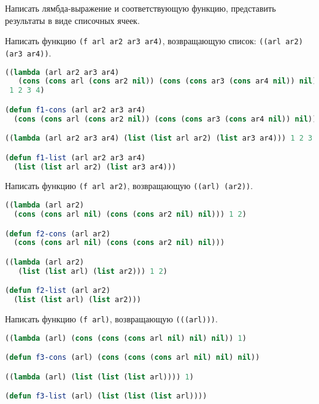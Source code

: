 Написать лямбда-выражение и соответствующую функцию, представить результаты в
виде списочных ячеек.

Написать функцию \verb|(f arl ar2 ar3 ar4)|, возвращающую \newline список:
\verb|((arl ar2) (ar3 ar4))|.

\begin{lstlisting}[language=Lisp]
((lambda (arl ar2 ar3 ar4)
   (cons (cons arl (cons ar2 nil)) (cons (cons ar3 (cons ar4 nil)) nil)))
 1 2 3 4)

(defun f1-cons (arl ar2 ar3 ar4)
  (cons (cons arl (cons ar2 nil)) (cons (cons ar3 (cons ar4 nil)) nil)))

((lambda (arl ar2 ar3 ar4) (list (list arl ar2) (list ar3 ar4))) 1 2 3 4)

(defun f1-list (arl ar2 ar3 ar4)
  (list (list arl ar2) (list ar3 ar4)))
\end{lstlisting}

\begin{figure}[h]
    \centering
    \def\svgwidth{\textwidth}
    
\end{figure}

\pagebreak

Написать функцию \verb|(f arl ar2)|, возвращающую \verb|((arl) (ar2))|.

\begin{lstlisting}[language=Lisp]
((lambda (arl ar2)
  (cons (cons arl nil) (cons (cons ar2 nil) nil))) 1 2)

(defun f2-cons (arl ar2)
  (cons (cons arl nil) (cons (cons ar2 nil) nil)))

((lambda (arl ar2)
   (list (list arl) (list ar2))) 1 2)

(defun f2-list (arl ar2)
  (list (list arl) (list ar2)))
\end{lstlisting}

\begin{figure}[h]
    \centering
    \def\svgwidth{0.9\textwidth}
    
\end{figure}

Написать функцию \verb|(f arl)|, возвращающую \verb|(((arl)))|.

\begin{lstlisting}[language=Lisp]
((lambda (arl) (cons (cons (cons arl nil) nil) nil)) 1)

(defun f3-cons (arl) (cons (cons (cons arl nil) nil) nil))

((lambda (arl) (list (list (list arl)))) 1)

(defun f3-list (arl) (list (list (list arl))))
\end{lstlisting}

\begin{figure}[h]
    \centering
    \def\svgwidth{0.4\textwidth}
    
\end{figure}

